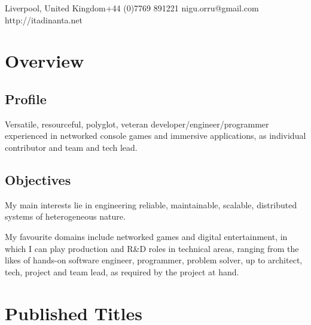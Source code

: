 \documentclass[a4paper,10pt]{article}
\begin{document}
    {Liverpool, United Kingdom}{+44 (0)7769 891221}
    {nigu.orru@gmail.com}
    {http://itadinanta.net}


    \section{Overview}

        \subsection{Profile}
            Versatile, resourceful, polyglot, veteran developer/engineer/programmer experienced in networked console
            games and immersive applications, as individual contributor and team and tech lead.

        \subsection{Objectives}
            My main interests lie in engineering reliable, maintainable, scalable, distributed systems of
            heterogeneous nature. \vspace{0.5em}

            My favourite domains include networked games and digital entertainment, in which I can play production
            and R\&D roles in technical areas, ranging from the likes of hands-on software engineer, programmer,
            problem solver, up to architect, tech, project and team lead, as required by the project at hand.


    \section{Published Titles}
\end{document}
